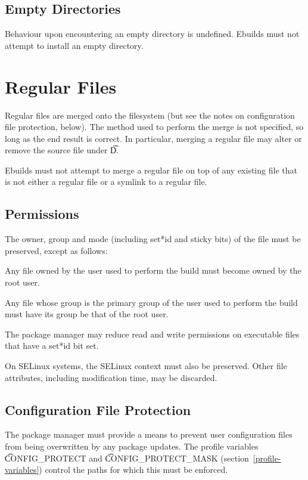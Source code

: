 \subsection{Empty Directories}

Behaviour upon encountering an empty directory is undefined. Ebuilds must not attempt to install an
empty directory.

\section{Regular Files}

Regular files are merged onto the filesystem (but see the notes on configuration file protection,
below). The method used to perform the merge is not specified, so long as the end result is correct.
In particular, merging a regular file may alter or remove the source file under \t{D}.

Ebuilds must not attempt to merge a regular file on top of any existing file that is not either a
regular file or a symlink to a regular file.

\subsection{Permissions}

The owner, group and mode (including set*id and sticky bits) of the file must be preserved, except
as follows:

\begin{compactitem}
\item Any file owned by the user used to perform the build must become owned by the root user.
\item Any file whose group is the primary group of the user used to perform the build must have
    its group be that of the root user.
\item The package manager may reduce read and write permissions on executable files that have a
    set*id bit set.
\end{compactitem}

On SELinux systems, the SELinux context must also be preserved. Other file attributes, including
modification time, may be discarded.

\subsection{Configuration File Protection}
\label{config-protect}

The package manager must provide a means to prevent user configuration files from being
overwritten by any package updates. The profile variables \t{CONFIG\_PROTECT} and
\t{CONFIG\_PROTECT\_MASK} (section~\ref{profile-variables}) control the paths for which this
must be enforced.

